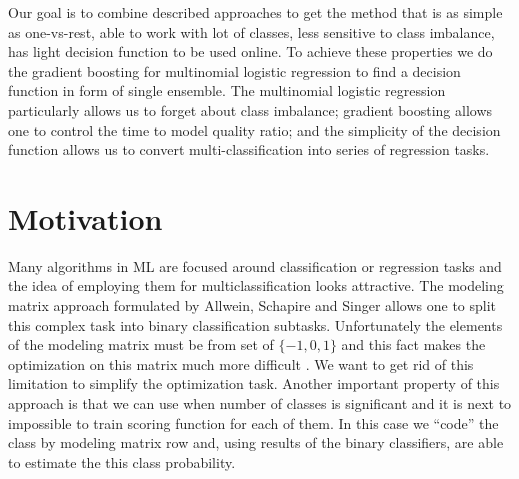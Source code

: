 \documentclass{article}
\begin{document}
Our goal is to combine described approaches to get the method that is as simple as one-vs-rest, able to work with lot of classes, less sensitive to class imbalance, has light decision function to be used online. To achieve these properties we do the gradient boosting for multinomial logistic regression to find a decision function in form of single ensemble. The multinomial logistic regression particularly allows us to forget about class imbalance; gradient boosting allows one to control the time to model quality ratio; and the simplicity of the decision function allows us to convert multi-classification into series of regression tasks.





\section{Motivation}

Many algorithms in ML are focused around classification or regression tasks and the idea of employing them for multiclassification looks attractive. The modeling matrix approach formulated by Allwein, Schapire and Singer \cite{Allwein00reducingmulticlass} allows one to split this complex task into binary classification subtasks. Unfortunately the elements of the modeling matrix must be from set of $\{-1,0,1\}$ and this fact makes the optimization on this matrix much more difficult \cite{Zhao_sparseoutput, modelmatrix2}. We want to get rid of this limitation to simplify the optimization task. Another important property of this approach is that we can use when number of classes is significant and it is next to impossible to train scoring function for each of them. In this case we ``code'' the class by modeling matrix row and, using results of the binary classifiers, are able to estimate the this class probability.
\end{document}
